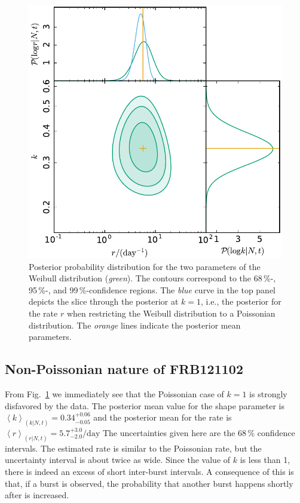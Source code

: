 \documentclass[fleqn,usenatbib]{mnras}
\newcommand{\new}[1]{#1}
\begin{document}
\begin{figure}
	\includegraphics[width=1.0\columnwidth]{2dpost.pdf}
	\caption{\label{fig:result}Posterior probability distribution for the two parameters of the Weibull distribution (\emph{green}). The contours correspond to the 68\,\%-, 95\,\%-, and 99\,\%-confidence regions. The \emph{blue} curve in the top panel depicts the slice through the posterior at $k=1$, i.e., the posterior for the rate $r$ when restricting the Weibull distribution to a Poissonian distribution. The \emph{orange} lines indicate the posterior mean parameters.}
\end{figure}


\subsection{Non-Poissonian nature of FRB121102}
\label{sec:non-poissonian}

From Fig.~\ref{fig:result} we immediately see that the Poissonian case of $k=1$ is strongly disfavored by the data. The posterior mean value for the shape parameter is \new{$\left<k\right>_{(k|N,t)} = 0.34^{+0.06}_{-0.05}$} and the posterior mean for the rate is \new{$\left<r\right>_{(r|N,t)} = 5.7^{+3.0}_{-2.0}/\mathrm{day}$ The uncertainties given here are the 68\,\% confidence intervals. The estimated rate is similar to the Poissonian rate, but the uncertainty interval is about twice as wide.} Since the value of $k$ is less than 1, there is indeed an excess of short inter-burst intervals. A consequence of this is that, if a burst is observed, the probability that another burst happens shortly after is increased.
\end{document}

